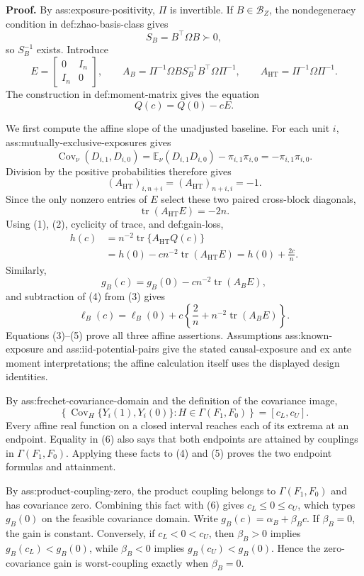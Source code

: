 \textbf{Proof.}
By ass:exposure-positivity, \(\Pi\) is invertible. If \(B\in\mathcal B_Z\), the nondegeneracy condition in def:zhao-basis-class gives
\[
S_B=B^{\top}\Omega B\succ0,
\]
so \(S_B^{-1}\) exists. Introduce
\[
E=\begin{bmatrix}0&I_n\\ I_n&0\end{bmatrix},\qquad
A_B=\Pi^{-1}\Omega B S_B^{-1}B^{\top}\Omega\Pi^{-1},\qquad
A_{\mathrm{HT}}=\Pi^{-1}\Omega\Pi^{-1}.
\]
The construction in def:moment-matrix gives the equation
\[
Q(c)=Q(0)-cE. \tag{1}
\]

We first compute the affine slope of the unadjusted baseline. For each unit \(i\), ass:mutually-exclusive-exposures gives
\[
\operatorname{Cov}_{\nu}(D_{i,1},D_{i,0})
=\mathbb E_{\nu}(D_{i,1}D_{i,0})-\pi_{i,1}\pi_{i,0}
=-\pi_{i,1}\pi_{i,0}.
\]
Division by the positive probabilities therefore gives
\[
(A_{\mathrm{HT}})_{i,n+i}=(A_{\mathrm{HT}})_{n+i,i}=-1.
\]
Since the only nonzero entries of \(E\) select these two paired cross-block diagonals,
\[
\operatorname{tr}(A_{\mathrm{HT}}E)=-2n. \tag{2}
\]
Using (1), (2), cyclicity of trace, and def:gain-loss,
\[
\begin{aligned}
h(c)
&=n^{-2}\operatorname{tr}\{A_{\mathrm{HT}}Q(c)\}\\
&=h(0)-c n^{-2}\operatorname{tr}(A_{\mathrm{HT}}E)
=h(0)+\frac{2c}{n}. \tag{3}
\end{aligned}
\]
Similarly,
\[
g_B(c)=g_B(0)-c n^{-2}\operatorname{tr}(A_BE), \tag{4}
\]
and subtraction of (4) from (3) gives
\[
\ell_B(c)=\ell_B(0)+c\left\{\frac2n+n^{-2}\operatorname{tr}(A_BE)\right\}. \tag{5}
\]
Equations (3)--(5) prove all three affine assertions. Assumptions ass:known-exposure and ass:iid-potential-pairs give the stated causal-exposure and ex ante moment interpretations; the affine calculation itself uses the displayed design identities.

By ass:frechet-covariance-domain and the definition of the covariance image,
\[
\left\{\operatorname{Cov}_H\{Y_i(1),Y_i(0)\}:H\in\Gamma(F_1,F_0)\right\}
=[c_L,c_U]. \tag{6}
\]
Every affine real function on a closed interval reaches each of its extrema at an endpoint. Equality in (6) also says that both endpoints are attained by couplings in \(\Gamma(F_1,F_0)\). Applying these facts to (4) and (5) proves the two endpoint formulas and attainment.

By ass:product-coupling-zero, the product coupling belongs to \(\Gamma(F_1,F_0)\) and has covariance zero. Combining this fact with (6) gives \(c_L\le0\le c_U\), which types \(g_B(0)\) on the feasible covariance domain. Write \(g_B(c)=\alpha_B+\beta_Bc\). If \(\beta_B=0\), the gain is constant. Conversely, if \(c_L<0<c_U\), then \(\beta_B>0\) implies \(g_B(c_L)<g_B(0)\), while \(\beta_B<0\) implies \(g_B(c_U)<g_B(0)\). Hence the zero-covariance gain is worst-coupling exactly when \(\beta_B=0\).

